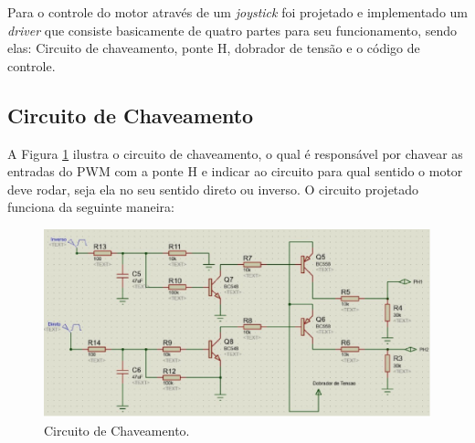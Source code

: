 Para o controle do motor através de um \textit{joystick} foi projetado e
implementado um \textit{driver} que consiste basicamente de quatro partes para
seu funcionamento, sendo elas: Circuito de chaveamento, ponte H, dobrador de
tensão e o código de controle.

\subsection{Circuito de Chaveamento}

A Figura \ref{fig:chaveamento} ilustra o circuito de chaveamento, o qual é
responsável por chavear as entradas do PWM com a ponte H e indicar ao circuito
para qual sentido o motor deve rodar, seja ela no seu sentido direto ou inverso.
O circuito projetado funciona da seguinte maneira:

\begin{figure}[h!]
  \centering
  \includegraphics[scale=0.3]{figuras/Chaveamento.jpg}
  \caption{Circuito de Chaveamento.}
    \label{fig:chaveamento}
\end{figure}

